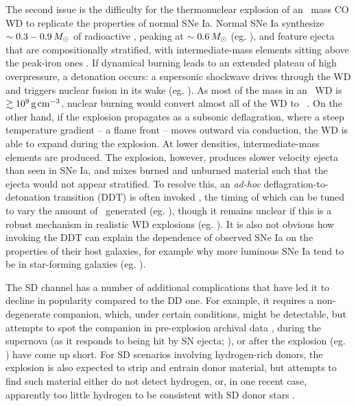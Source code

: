 The second issue is the difficulty for the thermonuclear explosion of an \Mch\ mass CO WD to replicate the properties of normal SNe Ia.  Normal SNe Ia synthesize $\sim0.3 - 0.9\,\Msun$ of radioactive \Ni, peaking at $\sim0.6\,\Msun$ (eg. \citealt{stri+06, pirotk14}), and feature ejecta that are compositionally stratified, with intermediate-mass elements sitting above the peak-iron ones \citep{howe11, hill+13}.  If dynamical burning leads to an extended plateau of high overpressure, a detonation occurs: a supersonic shockwave drives through the WD and triggers nuclear fusion in its wake (eg. \citealt{seit+09}).  As most of the mass in an \Mch\ WD is $\gtrsim10^9\,\gcc$, nuclear burning would convert almost all of the WD to \Ni\ \citep{howe11, hill+13}.  On the other hand, if the explosion propagates as a subsonic deflagration, where a steep temperature gradient -- a flame front -- moves outward via conduction, the WD is able to expand during the explosion.  At lower densities, intermediate-mass elements are produced.  The explosion, however, produces slower velocity ejecta than seen in SNe Ia, and mixes burned and unburned material such that the ejecta would not appear stratified.  To resolve this, an \textit{ad-hoc} deflagration-to-detonation transition (DDT) is often invoked \citep{khok91}, the timing of which can be tuned to vary the amount of \Ni\ generated (eg. \citealt{hill+13}), though it remains unclear if this is a robust mechanism in realistic WD explosions (eg. \citealt{fishj15}).  It is also not obvious how invoking the DDT can explain the dependence of observed SNe Ia on the properties of their host galaxies, for example why more luminous SNe Ia tend to be in star-forming galaxies (eg. \citealt{hamu+00, sull+10}).

The SD channel has a number of additional complications \citep{maozmn14, tsebs15} that have led it to decline in popularity compared to the DD one.  For example, it requires a non-degenerate companion, which, under certain conditions, might be detectable, but attempts to spot the companion in pre-explosion archival data \citep{li+11cpn, nielvn13, niel+14}, during the supernova (as it responds to being hit by SN ejecta; \citealt{bloo+12,ollms15}), or after the explosion (eg. \citealt{kerz+14rem}) have come up short.  For SD scenarios involving hydrogen-rich donors, the explosion is also expected to strip and entrain donor material, but attempts to find such material either do not detect hydrogen, or, in one recent case, apparently too little hydrogen to be consistent with SD donor stars \citep{magu+16}.  

